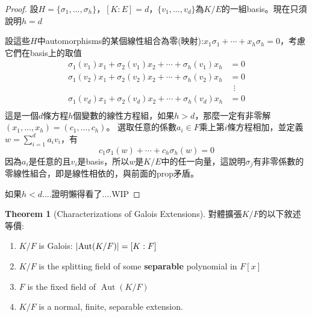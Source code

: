 \documentclass[12pt]{article}
\theoremstyle{definition}
\newtheorem{thm}{Theorem}
\DeclareMathOperator{\Aut}{Aut}
\begin{document}
\begin{proof}
	設$H=\{\sigma_1,...,\sigma_h\}$，$[K:E]=d$，$\{v_1,...,v_d\}$為$K/E$的一組basis。現在只須說明$h=d$

	設這些$H$中automorphisms的某個線性組合為零(映射):$x_1\sigma_1+\cdots+x_h\sigma_h=0$，考慮它們在basis上的取值
	\begin{align*}
		\sigma_1(v_1)x_1+\sigma_2(v_1)x_2+\cdots+\sigma_h(v_1)x_h & = 0        \\
		\sigma_1(v_2)x_1+\sigma_2(v_2)x_2+\cdots+\sigma_h(v_2)x_h & = 0        \\
		                                                          & \ \ \vdots \\
		\sigma_1(v_d)x_1+\sigma_2(v_d)x_2+\cdots+\sigma_h(v_d)x_h & = 0        \\
	\end{align*}
	這是一個$d$條方程$h$個變數的線性方程組，如果$h>d$，那麼一定有非零解$(x_1,...,x_h)=(c_1,...,c_h)$。
	選取任意的係數$a_i\in F$乘上第$i$條方程相加，並定義$w=\sum_{i=1}^d a_i v_i$，有
	\[c_1\sigma_1(w)+\cdots+c_h\sigma_h(w)=0\]
	因為$a_i$是任意的且$v_i$是basis，所以$w$是$K/E$中的任一向量，這說明$\sigma_j$有非零係數的零線性組合，即是線性相依的，與前面的prop矛盾。

	如果$h<d$....證明懶得看了....WIP
\end{proof}

\begin{thm}[Characterizations of Galois Extensions]
	對體擴張$K/F$的以下敘述等價:
	\begin{enumerate}
		\item $K/F$ is Galois: $\abs{\Aut(K/F)}=[K:F]$
		\item $K/F$ is the splitting field of some \textbf{separable} polynomial in $F[x]$
		\item $F$ is the fixed field of $\Aut(K/F)$
		\item $K/F$ is a normal, finite, separable extension.
	\end{enumerate}
\end{thm}
\end{document}
